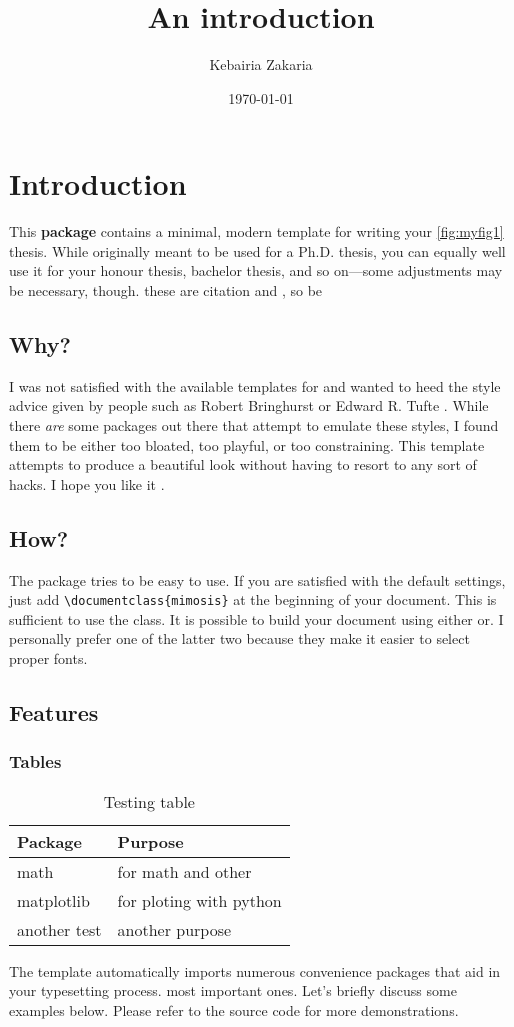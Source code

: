 \documentclass{tufte-org}
\author{Kebairia Zakaria}
\date{\today}
\title{An introduction}
\numberwithin{equation}{chapter}
\numberwithin{listing}{chapter}
\begin{document}
\setcounter{tocdepth}{1}
 
\frontmatter
\glsenablehyper
\tableofcontents
\mainmatter


\section{Introduction}
\label{sec:org1451498}
This \textbf{package} contains a minimal, modern template for writing your \autoref{fig:myfig1}
thesis. While originally meant to be used for a Ph.D. thesis, you can
equally well use it for your honour thesis, bachelor thesis, and so
on---some adjustments may be necessary, though.
these are citation \cite{Laramee11,Laramee10} and \cite{Edelsbrunner02}, \cite{Edelsbrunner10}
so be \autocite{Tufte01}
\subsection{Why?}
\label{sec:org928e55e}
I was not satisfied with the available templates for and wanted
to heed the style advice given by people such as Robert Bringhurst \cite{Bringhurst12} or Edward R.
Tufte \cite{Tufte90,Tufte01} . While there \emph{are} some packages out 
there that attempt to emulate these styles, I found them to be either
too bloated, too playful, or too constraining. This template attempts to
produce a beautiful look without having to resort to any sort of hacks.
I hope you like it \cite{nikouei19:_i_safe}.

\subsection{How?}
\label{sec:org83a9687}
The package tries to be easy to use. If you are satisfied with the
default settings, just add \texttt{\textbackslash{}documentclass\{mimosis\}} at the beginning of your document.
This is sufficient to use the class.
It is possible to build your document using either  or. I personally prefer one of the latter two because they make
it easier to select proper fonts.
\subsection{Features}
\label{sec:org46b5bc3}
\subsubsection{Tables}
\label{sec:org3af9c3c}

\begin{table}[htbp]
\caption{\label{table1}Testing table}
\centering
\begin{tabular}{ll}
\toprule
\textbf{Package} & \textbf{Purpose}\\
\midrule
math & for math and other\\
matplotlib & for ploting with python\\
another test & another purpose\\
\bottomrule
\end{tabular}
\end{table}
The template automatically imports numerous convenience packages that
aid in your typesetting process.
most important ones. Let's briefly discuss some examples below. Please
refer to the source code for more demonstrations.
\end{document}
